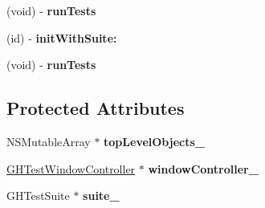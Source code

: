 \begin{DoxyCompactItemize}
\item 
\hypertarget{interface_g_h_test_app_aa4468189a6edda16bb85c6d3e4dda3a2}{
(void) -\/ {\bfseries run\-Tests}}
\label{interface_g_h_test_app_aa4468189a6edda16bb85c6d3e4dda3a2}

\item 
\hypertarget{interface_g_h_test_app_a7a02967b5f67c22338d416742d43b9b1}{
(id) -\/ {\bfseries init\-With\-Suite\-:}}
\label{interface_g_h_test_app_a7a02967b5f67c22338d416742d43b9b1}

\item 
\hypertarget{interface_g_h_test_app_aa4468189a6edda16bb85c6d3e4dda3a2}{
(void) -\/ {\bfseries run\-Tests}}
\label{interface_g_h_test_app_aa4468189a6edda16bb85c6d3e4dda3a2}

\end{DoxyCompactItemize}
\subsection*{\-Protected \-Attributes}
\begin{DoxyCompactItemize}
\item 
\hypertarget{interface_g_h_test_app_a49fcb9dd39884229624ac2484ce0fc5e}{
\-N\-S\-Mutable\-Array $\ast$ {\bfseries top\-Level\-Objects\-\_\-}}
\label{interface_g_h_test_app_a49fcb9dd39884229624ac2484ce0fc5e}

\item 
\hypertarget{interface_g_h_test_app_aec0a1e7e7f4ac043e08f9aea969da309}{
\hyperlink{interface_g_h_test_window_controller}{\-G\-H\-Test\-Window\-Controller} $\ast$ {\bfseries window\-Controller\-\_\-}}
\label{interface_g_h_test_app_aec0a1e7e7f4ac043e08f9aea969da309}

\item 
\hypertarget{interface_g_h_test_app_af2ef064678f9467d02d3733cb44b7990}{
\-G\-H\-Test\-Suite $\ast$ {\bfseries suite\-\_\-}}
\label{interface_g_h_test_app_af2ef064678f9467d02d3733cb44b7990}

\end{DoxyCompactItemize}


